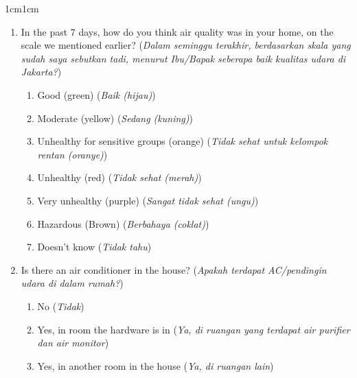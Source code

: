 \documentclass[9pt,twoside]{pnas-new}
\begin{document}
\begin{adjustwidth}{1cm}{1cm}
\begin{enumerate}
    \item In the past 7 days, how do you think air quality was in your home, on the scale we mentioned earlier? (\textit{Dalam seminggu terakhir, berdasarkan skala yang sudah saya sebutkan tadi, menurut Ibu/Bapak seberapa baik kualitas udara di Jakarta?})

    \begin{enumerate}
        \item Good (green) (\textit{Baik (hijau)})
        \item Moderate (yellow) (\textit{Sedang (kuning)})
        \item Unhealthy for sensitive groups (orange) (\textit{Tidak sehat untuk kelompok rentan (oranye)})
        \item Unhealthy (red) (\textit{Tidak sehat (merah)})
        \item Very unhealthy (purple) (\textit{Sangat tidak sehat (ungu)})
        \item Hazardous (Brown) (\textit{Berbahaya (coklat)})
        \item Doesn't know (\textit{Tidak tahu})
    \end{enumerate}

    
    \item Is there an air conditioner in the house? (\textit{Apakah terdapat AC/pendingin udara di dalam rumah?})
    \begin{enumerate}
        \item No (\textit{Tidak})
        \item Yes, in room the hardware is in (\textit{Ya, di ruangan yang terdapat air purifier dan air monitor})
        \item Yes, in another room in the house (\textit{Ya, di ruangan lain})
    \end{enumerate}
     

\end{enumerate}
\end{adjustwidth}
\end{document}
